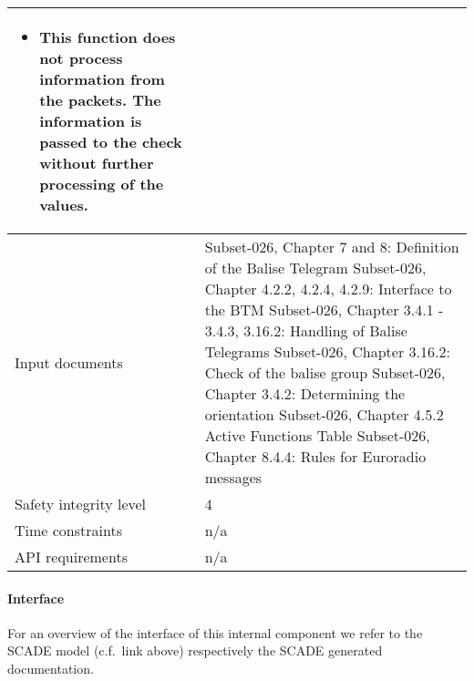 \begin{longtable}{p{}p{}}
\begin{itemize}
\item This function does not process information from the packets. The information is passed to the check without further processing of the values. 
\end{itemize} \\
\midrule
Input documents	&
  Subset-026, Chapter 7 and 8: Definition of the Balise Telegram\newline
  Subset-026, Chapter 4.2.2, 4.2.4, 4.2.9: Interface to the BTM\newline
  Subset-026, Chapter 3.4.1 - 3.4.3, 3.16.2: Handling of Balise Telegrams\newline
  Subset-026, Chapter 3.16.2: Check of the balise group\newline
  Subset-026, Chapter 3.4.2: Determining the orientation\newline
  Subset-026, Chapter 4.5.2 Active Functions Table\newline
  Subset-026, Chapter 8.4.4: Rules for Euroradio messages \\
\midrule
Safety integrity level		& 4 \\
\midrule
Time constraints		& n/a \\
\midrule
API requirements 		& n/a \\
\bottomrule
\end{longtable}


\paragraph{Interface}

For an overview of the interface of this internal component we refer to the SCADE model (c.f.~link above) respectively the SCADE generated documentation.